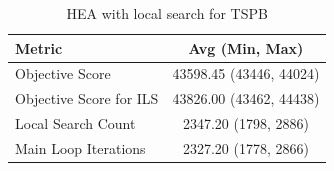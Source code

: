 \begin{table}[h!]
\centering
\begin{tabular}{lc}
\hline
Metric & Avg (Min, Max) \\
\hline
Objective Score & 43598.45 (43446, 44024) \\
Objective Score for ILS & 43826.00 (43462, 44438) \\
Local Search Count & 2347.20 (1798, 2886) \\
Main Loop Iterations & 2327.20 (1778, 2866) \\
\hline
\end{tabular}
\caption{HEA with local search for TSPB}
\label{tab:TSPB_hea_with_ls_scores}
\end{table}

